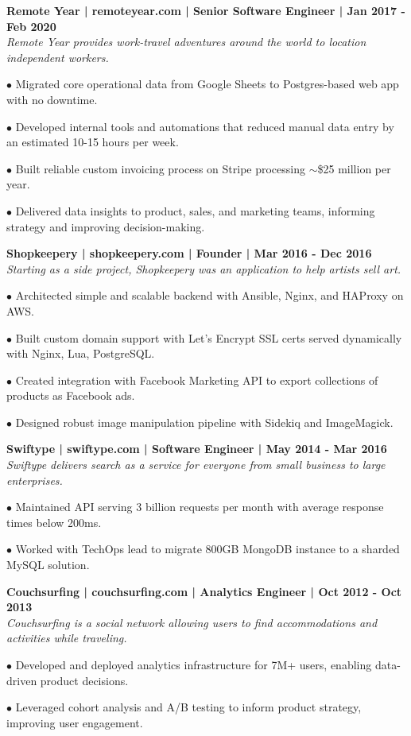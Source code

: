 \documentclass{article}
\begin{document}
\begin{description}
	 \item \textbf{Remote Year | remoteyear.com | Senior Software Engineer | Jan 2017 - Feb 2020} \\
	 \textit{Remote Year provides work-travel adventures around the world to location independent workers.}
	 \item$\bullet$ Migrated core operational data from Google Sheets to Postgres-based web app with no downtime.
	 \item$\bullet$ Developed internal tools and automations that reduced manual data entry by an estimated 10-15 hours per week.
	 \item$\bullet$ Built reliable custom invoicing process on Stripe processing $\sim$\$25 million per year.
	 \item$\bullet$ Delivered data insights to product, sales, and marketing teams, informing strategy and improving decision-making.
	
	 \item \textbf{Shopkeepery | shopkeepery.com | Founder | Mar 2016 - Dec 2016} \\
	 \textit{Starting as a side project, Shopkeepery was an application to help artists sell art.}
	 
	 \item$\bullet$ Architected simple and scalable backend with Ansible, Nginx, and HAProxy on AWS.
	 \item$\bullet$ Built custom domain support with Let's Encrypt SSL certs served dynamically with Nginx, Lua, PostgreSQL.
	 \item$\bullet$ Created integration with Facebook Marketing API to export collections of products as Facebook ads.
	 \item$\bullet$ Designed robust image manipulation pipeline with Sidekiq and ImageMagick.
	
	 \item \textbf{Swiftype | swiftype.com | Software Engineer | May 2014 - Mar 2016} \\
	 \textit{Swiftype delivers search as a service for everyone from small business to large enterprises.}
	 
	 \item$\bullet$ Maintained API serving 3 billion requests per month with average response times below 200ms.
	 \item$\bullet$ Worked with TechOps lead to migrate 800GB MongoDB instance to a sharded MySQL solution.
	 	
	 \item \textbf{Couchsurfing | couchsurfing.com | Analytics Engineer | Oct 2012 - Oct 2013} \\
	  \textit{Couchsurfing is a social network allowing users to find accommodations and activities while traveling.}
	 \item$\bullet$ Developed and deployed analytics infrastructure for 7M+ users, enabling data-driven product decisions.
	 \item$\bullet$ Leveraged cohort analysis and A/B testing to inform product strategy, improving user engagement.
	 
	 
	\end{description}
\end{document}
